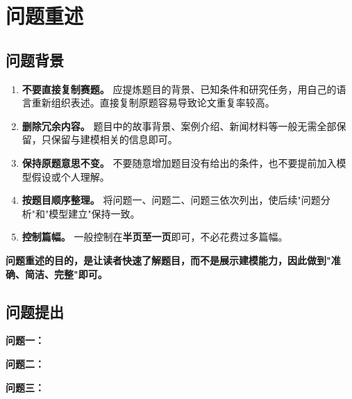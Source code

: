 \section{问题重述}
\subsection{问题背景}
\begin{enumerate}[label=(\arabic*), leftmargin=2.5em, itemsep=0.3em]
\item \textbf{不要直接复制赛题。} 应提炼题目的背景、已知条件和研究任务，用自己的语言重新组织表述。直接复制原题容易导致论文重复率较高。

\item \textbf{删除冗余内容。} 题目中的故事背景、案例介绍、新闻材料等一般无需全部保留，只保留与建模相关的信息即可。

\item \textbf{保持原题意思不变。} 不要随意增加题目没有给出的条件，也不要提前加入模型假设或个人理解。

\item \textbf{按题目顺序整理。} 将问题一、问题二、问题三依次列出，使后续"问题分析"和"模型建立"保持一致。

\item \textbf{控制篇幅。} 一般控制在\textbf{半页至一页}即可，不必花费过多篇幅。
\end{enumerate}

\textbf{问题重述的目的，是让读者快速了解题目，而不是展示建模能力，因此做到"准确、简洁、完整"即可。}

\subsection{问题提出}


\textbf{问题一：}

\textbf{问题二：}

\textbf{问题三：}
